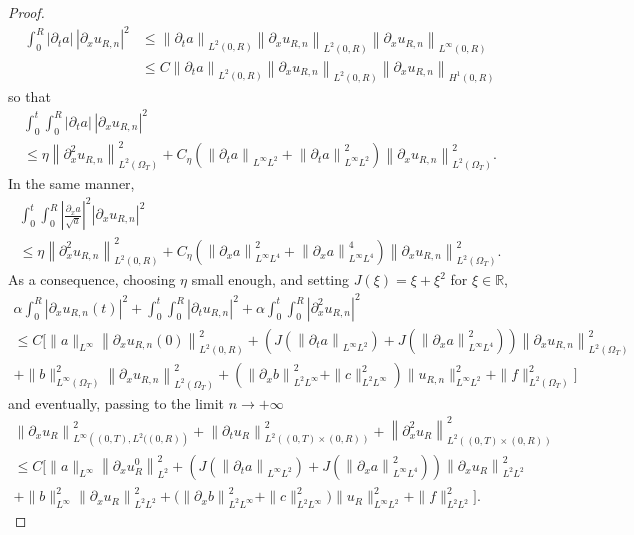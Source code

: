 \documentclass[10pt]{amsart}
\theoremstyle{definition}\newtheorem{defi}[theo]{Definition}\newtheorem{rema}[theo]{Remark}\newtheorem{exam}[theo]{Example}\newtheorem{exem}[theo]{Example}\newtheorem{nota}[theo]{Notation}
\newcommand{\R}{\mathbb{R}}
\newcommand{\p}{\partial}
\begin{document}
\begin{proof}
\begin{align*}
\int_0^R \left|\partial_t a\right|\, \left|\partial_x u_{R,n}\right|^2 & \leq \left\|\partial_t a\right\|_{L^2(0,R)} \left\|\partial_x u_{R,n}\right\|_{L^2(0,R)} \left\|\partial_x u_{R,n}\right\|_{L^\infty(0,R)} \\
& \leq C \left\|\partial_t a\right\|_{L^2(0,R)} \left\|\partial_x u_{R,n}\right\|_{L^2(0,R)} \left\|\partial_x u_{R,n}\right\|_{H^1(0,R)}
\end{align*}
so that
\begin{multline*}
\int_0^t \int_0^R \left|\partial_t a\right|\,\left|\partial_x u_{R,n}\right|^2 \\
\leq \eta \left\|\partial^2_x u_{R,n}\right\|_{L^2(\Omega_T)}^{2} + C_\eta \left(\left\|\partial_t a\right\|_{L^\infty L^2}+ \left\|\partial_t a\right\|_{L^\infty L^2}^2\right) \left\|\partial_x u_{R,n}\right\|_{L^2(\Omega_T)}^2.
\end{multline*}
In the same manner,
\begin{multline*}
\int_0^t\int_0^R \left|\frac{\partial_x a}{\sqrt{a}}\right|^2 \left|\partial_x u_{R,n}\right|^2 \\
\leq \eta \left\|\partial^2_x u_{R,n}\right\|_{L^2(0,R)}^{2} + C_\eta\left(\left\|\partial_x a\right\|_{L^\infty L^4}^2 +\left\|\partial_x a\right\|_{L^\infty L^4}^4\right) \left\|\partial_x u_{R,n}\right\|_{L^2(\Omega_T)}^2.
\end{multline*}
As a consequence, choosing $\eta$ small enough, and setting $J(\xi)=\xi + \xi^2$ for $\xi\in \R$,
\begin{multline*}
\alpha \int_0^R \left|\partial_x u_{R,n}(t)\right|^2 + \int_0^t \int_0^R \left|\partial_t u_{R,n}\right|^2 + \alpha \int_0^t \int_0^R \left|\partial^2_x u_{R,n}\right|^2\\
\leq C \Bigg[\|a\|_{L^\infty} \left\|\partial_x u_{R,n}(0)\right\|_{L^2(0,R)}^2 + \left(J\left(\left\|\partial_t a\right\|_{L^\infty L^2}\right) + J\left(\left\|\partial_x a\right\|_{L^\infty L^4}^2\right)\right) \left\|\partial_x u_{R,n}\right\|_{L^2(\Omega_T)}^2 \\
 + \|b\|_{L^\infty(\Omega_T)}^2 \left\|\partial_x u_{R,n}\right\|_{L^2(\Omega_T)}^2 +\left(\left\|\partial_x b\right\|_{L^2 L^\infty}^2 + \|c\|_{L^2 L^\infty}^2\right) \|u_{R,n}\|_{L^\infty L^2}^2 + \|f\|_{L^2(\Omega_T)}^2 \Bigg]
\end{multline*}
and eventually, passing to the limit $n\to +\infty$
\begin{multline*}
\left\| \p_x u_{R}\right\|_{L^\infty\left((0,T), L^2((0,R)\right)}^2 + \left\| \p_t u_{R}\right\|_{L^2\left((0,T)\times (0,R)\right)}^2 + \left\|\p_x^2 u_{R}\right\|_{L^2\left((0,T)\times (0,R)\right)}^2 \\
\leq C \Bigg[
\|a\|_{L^\infty}\left\|\partial_x u^0_R\right\|_{L^2}^2 + \left(J\left(\left\|\partial_t a\right\|_{L^\infty L^2}\right) + J\left(\left\|\partial_x a\right\|_{L^\infty L^4}^2\right)\right) \left\|\partial_x u_R\right\|_{L^2 L^2}^2
\\
+ \|b\|_{L^\infty}^2 \left\|\partial_x u_R\right\|_{L^2 L^2}^2+\big(\left\|\partial_x b\right\|_{L^2 L^\infty}^2 + \|c\|_{L^2L^\infty}^2\big) \|u_R\|_{L^\infty L^2}^2 + \|f\|_{L^2 L^2}^2
\Bigg].
\end{multline*}


\end{proof}
\end{document}
